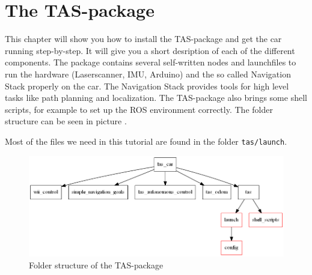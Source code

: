 \newcommand{\makro}[1]{\texttt{\textbackslash{}#1\{\}}}

\chapter{The TAS-package}
\label{sec:tas_package}

This chapter will show you how to install the TAS-package and get the car running step-by-step. It will give you a short desription of each of the different components. The package contains several self-written nodes and launchfiles to run the hardware (Laserscanner, IMU, Arduino) and the so called Navigation Stack properly on the car. The Navigation Stack provides tools for high level tasks like path planning and localization. The TAS-package also brings some shell scripts, for example to set up the ROS environment correctly. The folder structure can be seen in picture .

Most of the files we need in this tutorial are found in the folder \texttt{tas/launch}.

\begin{figure}[htbp]
	\centering
		\includegraphics[width=\textwidth]{diagrams/tas_folder_struct}
	\caption{Folder structure of the TAS-package}
	\label{fig:tas_folder_struct}
\end{figure}

\newpage
